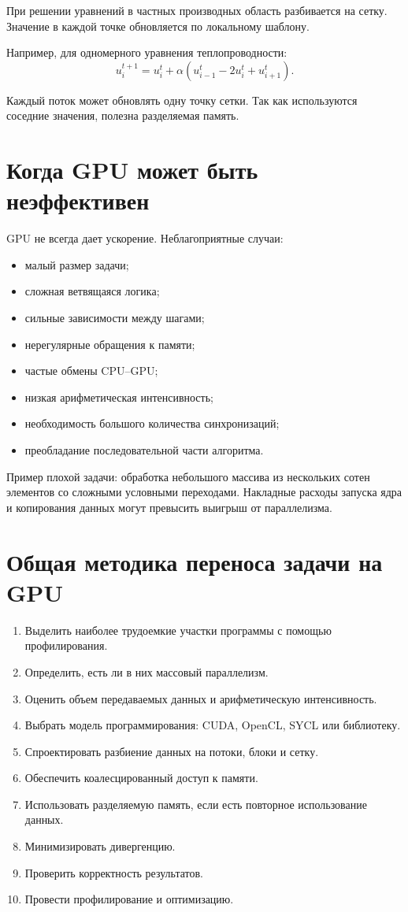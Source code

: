 \documentclass[12pt,a4paper]{article}
\begin{document}
При решении уравнений в частных производных область разбивается на сетку. Значение в каждой точке обновляется по локальному шаблону.

Например, для одномерного уравнения теплопроводности:
\[
    u_i^{t+1} =
    u_i^t + \alpha
    \left(
        u_{i-1}^t - 2u_i^t + u_{i+1}^t
    \right).
\]

Каждый поток может обновлять одну точку сетки. Так как используются соседние значения, полезна разделяемая память.

\section{Когда GPU может быть неэффективен}

GPU не всегда дает ускорение. Неблагоприятные случаи:

\begin{itemize}
    \item малый размер задачи;
    \item сложная ветвящаяся логика;
    \item сильные зависимости между шагами;
    \item нерегулярные обращения к памяти;
    \item частые обмены CPU--GPU;
    \item низкая арифметическая интенсивность;
    \item необходимость большого количества синхронизаций;
    \item преобладание последовательной части алгоритма.
\end{itemize}

Пример плохой задачи: обработка небольшого массива из нескольких сотен элементов со сложными условными переходами. Накладные расходы запуска ядра и копирования данных могут превысить выигрыш от параллелизма.

\section{Общая методика переноса задачи на GPU}

\begin{enumerate}
    \item Выделить наиболее трудоемкие участки программы с помощью профилирования.
    \item Определить, есть ли в них массовый параллелизм.
    \item Оценить объем передаваемых данных и арифметическую интенсивность.
    \item Выбрать модель программирования: CUDA, OpenCL, SYCL или библиотеку.
    \item Спроектировать разбиение данных на потоки, блоки и сетку.
    \item Обеспечить коалесцированный доступ к памяти.
    \item Использовать разделяемую память, если есть повторное использование данных.
    \item Минимизировать дивергенцию.
    \item Проверить корректность результатов.
    \item Провести профилирование и оптимизацию.
\end{enumerate}
\end{document}
